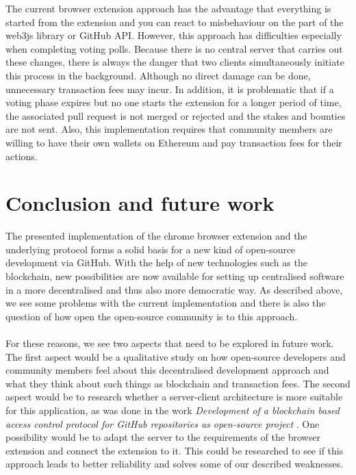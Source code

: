 \documentclass[sigconf]{acmart}
\begin{document}
The current browser extension approach has the advantage that everything is started from the extension and you can react to misbehaviour 
on the part of the web3js library or GitHub API. However, this approach has difficulties especially when completing voting polls.
Because there is no central server that carries out these changes, there is always the danger that two clients simultaneously initiate 
this process in the background. Although no direct damage can be done, unnecessary transaction fees may incur. In addition, it is 
problematic that if a voting phase expires but no one starts the extension for a longer period of time, the associated pull request is not 
merged or rejected and the stakes and bounties are not sent. Also, this implementation requires that community members are willing to 
have their own wallets on Ethereum and pay transaction fees for their actions.

\section{Conclusion and future work}
The presented implementation of the chrome browser extension and the underlying protocol forms a solid basis for a new kind of 
open-source development via GitHub. With the help of new technologies such as the blockchain, new possibilities are now available 
for setting up centralised software in a more decentralised and thus also more democratic way. As described above, we see some 
problems with the current implementation and there is also the question of how open the open-source community is to this approach. \\ \\
For these reasons, we see two aspects that need to be explored in future work. The first aspect would be a qualitative study on how 
open-source developers and community members feel about this decentralised development approach and what they think about such
 things as blockchain and transaction fees. The second aspect would be to research whether a server-client architecture is more 
suitable for this application, as was done in the work \textit{Development of a blockchain based access control protocol for 
GitHub repositories as open-source project} \cite{ulrich2020dev}. One possibility would be to adapt the server to the requirements
of the browser extension and connect the extension to it. This could be researched to see if this approach leads to better reliability 
and solves some of our described weaknesses.




\appendix
\end{document}
